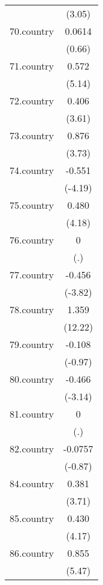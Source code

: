 {\begin{tabular}{l*{1}{c}}
            &      (3.05)         \\
[1em]
70.country  &      0.0614         \\
            &      (0.66)         \\
[1em]
71.country  &       0.572\sym{***}\\
            &      (5.14)         \\
[1em]
72.country  &       0.406\sym{***}\\
            &      (3.61)         \\
[1em]
73.country  &       0.876\sym{***}\\
            &      (3.73)         \\
[1em]
74.country  &      -0.551\sym{***}\\
            &     (-4.19)         \\
[1em]
75.country  &       0.480\sym{***}\\
            &      (4.18)         \\
[1em]
76.country  &           0         \\
            &         (.)         \\
[1em]
77.country  &      -0.456\sym{***}\\
            &     (-3.82)         \\
[1em]
78.country  &       1.359\sym{***}\\
            &     (12.22)         \\
[1em]
79.country  &      -0.108         \\
            &     (-0.97)         \\
[1em]
80.country  &      -0.466\sym{**} \\
            &     (-3.14)         \\
[1em]
81.country  &           0         \\
            &         (.)         \\
[1em]
82.country  &     -0.0757         \\
            &     (-0.87)         \\
[1em]
84.country  &       0.381\sym{***}\\
            &      (3.71)         \\
[1em]
85.country  &       0.430\sym{***}\\
            &      (4.17)         \\
[1em]
86.country  &       0.855\sym{***}\\
            &      (5.47)         \\

\end{tabular}}
